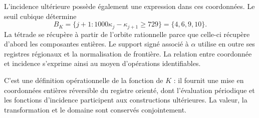 L'incidence ultérieure possède également une expression dans ces
coordonnées. Le seuil cubique détermine
\[
 B_K=\{j+1:1000\kappa_j-\kappa_{j+1}\ge729\}
 =\{4,6,9,10\}.
\]
La tétrade se récupère à partir de l'orbite rationnelle parce que celle-ci
récupère d'abord les composantes entières. Le support signé associé
à \(\alpha\) utilise en outre ses registres régionaux et la normalisation
de frontière. La relation entre coordonnée et incidence s'exprime ainsi
au moyen d'opérations identifiables.

C'est une définition opérationnelle de la fonction de \(K\) : il fournit
une mise en coordonnées entières réversible du registre orienté, dont
l'évaluation périodique et les fonctions d'incidence participent aux
constructions ultérieures. La valeur, la transformation et le domaine
sont conservés conjointement.

